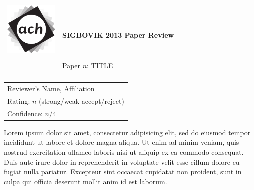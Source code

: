 \documentclass[12pt]{article}
\begin{document}
{\sffamily
\begin{tabular}{ll}
\multirow{2}{*}{\includegraphics[width=1in]{ach.png}}\\
& \textbf{\Huge{SIGBOVIK 2013 Paper Review}} \\ &\\
& \LARGE{Paper $n$: TITLE} \\
&\\
\hline
\end{tabular}}
\vspace{2em}

{\large\bf
\begin{tabular}{l}
Reviewer's Name, Affiliation \\
Rating: $n$ (strong/weak accept/reject) \\
Confidence: $n$/4 \\
\end{tabular}}
\vspace{1em}

Lorem ipsum dolor sit amet, consectetur adipisicing elit, sed do eiusmod tempor
incididunt ut labore et dolore magna aliqua. Ut enim ad minim veniam, quis
nostrud exercitation ullamco laboris nisi ut aliquip ex ea commodo consequat.
Duis aute irure dolor in reprehenderit in voluptate velit esse cillum dolore eu
fugiat nulla pariatur. Excepteur sint occaecat cupidatat non proident, sunt in
culpa qui officia deserunt mollit anim id est laborum.
\end{document}
